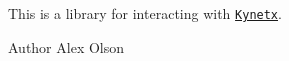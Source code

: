 This is a library for interacting with \href{http://www.kynetx.com}{\tt Kynetx}. \begin{DoxyAuthor}{Author}
Alex Olson 
\end{DoxyAuthor}
